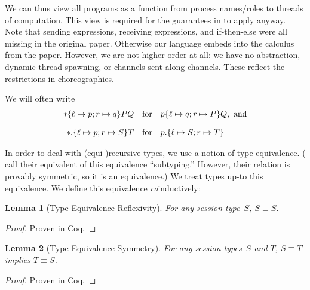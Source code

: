 \documentclass{article}
\newtheorem{lem}{Lemma}
\theoremstyle{definition}
\newcommand{\subst}[3]{#1~[#2 \mapsto #3]}
\begin{document}
\begin{syntax}
    \alternative{\PiEnd}
  \category[Programs]{\Pi,\cdots}
\end{syntax}
We can thus view all programs as a function from process names/roles to threads of computation.
This view is required for the guarantees in \citet{ScalasY19} to apply anyway.
Note that sending expressions, receiving expressions, and if-then-else were all missing in the original paper.
Otherwise our language embeds into the calculus from the paper.
However, we are not higher-order at all: we have no abstraction, dynamic thread spawning, or channels sent along channels.
These reflect the restrictions in choreographies.

We will often write $$
\begin{array}{rcl}
  *\{\ell \mapsto p; r \mapsto q\}{P}{Q}&\text{for}&p\{\ell \mapsto q; r \mapsto P\}{Q},~\text{and}\\[1em]
  *.\{\ell \mapsto p ; r \mapsto S\}{T}&\text{for}&p.\{\ell \mapsto S ; r \mapsto T\}
\end{array}
$$

In order to deal with (equi-)recursive types, we use a notion of type equivalence.
(\citet{ScalasY19} call their equivalent of this equivalence ``subtyping.''
However, their relation is provably symmetric, so it is an equivalence.)
We treat types up-to this equivalence.
We define this equivalence \emph{co}inductively:
\begin{lem}[Type Equivalence Reflexivity]
  \label{lem:type-refl}
  For any session type~$S$, $S \equiv S$.
\end{lem}
\begin{proof}
  Proven in Coq.
\end{proof}
\begin{lem}[Type Equivalence Symmetry]
  \label{lem:type-sym}
  For any session types~$S$ and $T$, $S \equiv T$ implies $T \equiv S$.
\end{lem}
\begin{proof}
  Proven in Coq.
\end{proof}
\end{document}
